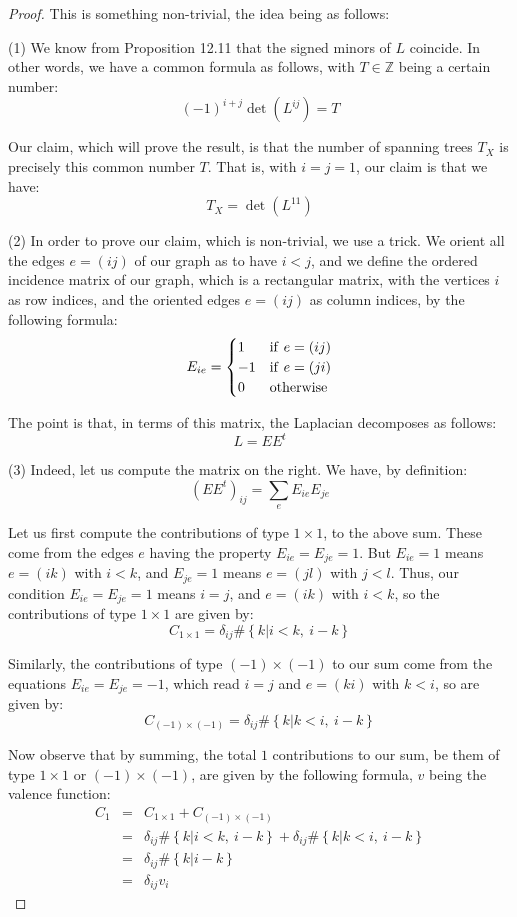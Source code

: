 \documentclass[12pt]{amsbook}
\begin{document}
\begin{proof}
This is something non-trivial, the idea being as follows:

\medskip

(1) We know from Proposition 12.11 that the signed minors of $L$ coincide. In other words, we have a common formula as follows, with $T\in\mathbb Z$ being a certain number:
$$(-1)^{i+j}\det(L^{ij})=T$$

Our claim, which will prove the result, is that the number of spanning trees $T_X$ is precisely this common number $T$. That is, with $i=j=1$, our claim is that we have:
$$T_X=\det(L^{11})$$

(2) In order to prove our claim, which is non-trivial, we use a trick. We orient all the edges $e=(ij)$ of our graph as to have $i<j$, and we define the ordered incidence matrix of our graph, which is a rectangular matrix, with the vertices $i$ as row indices, and the oriented edges $e=(ij)$ as column indices, by the following formula:
$$E_{ie}=\begin{cases}
1&{\rm if}\ e=(ij)\\
-1&{\rm if}\ e=(ji)\\
0&{\rm otherwise}
\end{cases}$$

The point is that, in terms of this matrix, the Laplacian decomposes as follows:
$$L=EE^t$$

(3) Indeed, let us compute the matrix on the right. We have, by definition:
$$(EE^t)_{ij}=\sum_eE_{ie}E_{je}$$

Let us first compute the contributions of type $1\times1$, to the above sum. These come from the edges $e$ having the property $E_{ie}=E_{je}=1$. But $E_{ie}=1$ means $e=(ik)$ with $i<k$, and $E_{je}=1$ means $e=(jl)$ with $j<l$. Thus, our condition $E_{ie}=E_{je}=1$ means $i=j$, and $e=(ik)$ with $i<k$, so the contributions of type $1\times1$ are given by:
$$C_{1\times1}=\delta_{ij}\#\left\{k\Big|i<k,\ i-k\right\}$$

Similarly, the contributions of type $(-1)\times(-1)$ to our sum come from the equations $E_{ie}=E_{je}=-1$, which read $i=j$ and $e=(ki)$ with $k<i$, so are given by:
$$C_{(-1)\times(-1)}=\delta_{ij}\#\left\{k\Big|k<i,\ i-k\right\}$$

Now observe that by summing, the total $1$ contributions to our sum, be them of type $1\times1$ or $(-1)\times(-1)$, are given by the following formula, $v$ being the valence function:
\begin{eqnarray*}
C_1
&=&C_{1\times1}+C_{(-1)\times(-1)}\\
&=&\delta_{ij}\#\left\{k\Big|i<k,\ i-k\right\}+\delta_{ij}\#\left\{k\Big|k<i,\ i-k\right\}\\
&=&\delta_{ij}\#\left\{k\Big|i-k\right\}\\
&=&\delta_{ij}v_i
\end{eqnarray*}


\end{proof}
\end{document}
